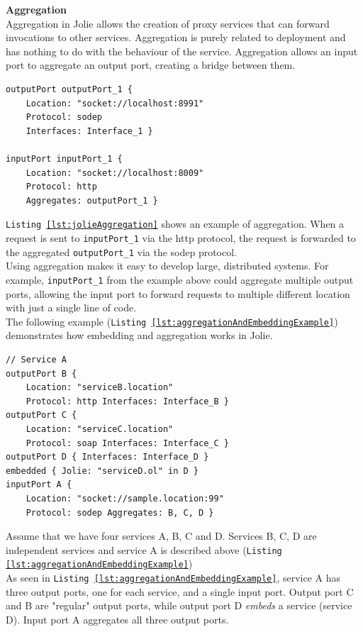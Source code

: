 \documentclass[12pt,a4paper]{article}
\begin{document}
\textbf{Aggregation} \\
Aggregation in Jolie allows the creation of proxy services that can forward invocations to other services. Aggregation is purely related to deployment and has nothing to do with the behaviour of the service. Aggregation allows  an input port to aggregate an output port, creating a bridge between them. 
\begin{lstlisting}[caption={Jolie aggregation},label={lst:jolieAggregation}]
outputPort outputPort_1 {
	Location: "socket://localhost:8991"
	Protocol: sodep
	Interfaces: Interface_1 }
 
inputPort inputPort_1 {
	Location: "socket://localhost:8009"
	Protocol: http
	Aggregates: outputPort_1 }
\end{lstlisting}
\texttt{Listing \ref{lst:jolieAggregation}} shows an example of aggregation. When a request is sent to \texttt{inputPort\_1} via the http protocol, the request is forwarded to the aggregated \texttt{outputPort\_1} via the sodep protocol. \\
Using aggregation makes it easy to develop large, distributed systems. For example, \texttt{inputPort\_1} from the example above could aggregate multiple output ports, allowing the input port to forward requests to multiple different location with just a single line of code. \\

\newpage
The following example (\texttt{Listing \ref{lst:aggregationAndEmbeddingExample}}) demonstrates how embedding and aggregation works in Jolie. 
\begin{lstlisting}[caption={Aggregation and embedding example},label={lst:aggregationAndEmbeddingExample}]
// Service A
outputPort B { 
	Location: "serviceB.location"
	Protocol: http Interfaces: Interface_B }
outputPort C {
	Location: "serviceC.location"
	Protocol: soap Interfaces: Interface_C }
outputPort D { Interfaces: Interface_D }
embedded { Jolie: "serviceD.ol" in D }
inputPort A { 
	Location: "socket://sample.location:99"
	Protocol: sodep Aggregates: B, C, D }
\end{lstlisting}
Assume that we have four services A, B, C and D. Services B, C, D are independent services and service A is described above (\texttt{Listing \ref{lst:aggregationAndEmbeddingExample}}) \\
As seen in \texttt{Listing \ref{lst:aggregationAndEmbeddingExample}}, service A has three output ports, one for each service, and a single input port. Output port C and B are "regular" output ports, while output port D \emph{embeds} a service (service D). Input port A aggregates all three output ports. 
\end{document}
